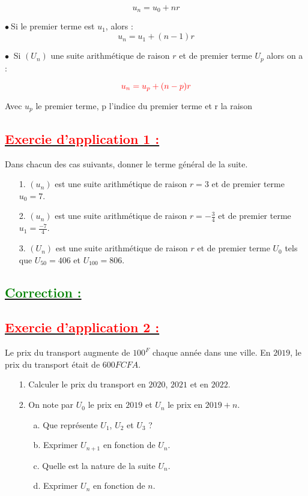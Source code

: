 \documentclass{article}
\begin{document}
$$u_{n}=u_{0}+nr$$
	
$\bullet\ $Si le premier terme est $u_{1}$, alors :
$$u_{n}=u_{1}+(n-1)r$$

$\bullet\ $ Si $(U_n)$ une suite arithmétique de raison $r$ et de premier terme $U_{p}$ alors on a : 
\begin{mdframed}[linecolor=red] %
    \[
    \color{red} u_{n} = u_{p} + (n-p)r
    \]
\end{mdframed}
Avec $u_{p}$ le premier terme, p l'indice du premier terme et r la raison
\subsection*{\underline{\textbf{\textcolor{red}{Exercie d'application 1 :}}}}
Dans chacun des cas suivants, donner le terme général de la suite.
\begin{itemize}
\item[1.]$(u_n)$ est une suite arithmétique de raison $r = 3$ et de premier terme $u_{0}= 7$.
\item[2.]$(u_n)$ est une suite arithmétique de raison $r=-\frac{3}{4}$ et de premier terme 
$u_{1}=\frac{-7}{4}$.
\item[3.] $(U_n)$ est une suite arithmétique de raison $r$ et de premier terme $U_{0}$ tels que $U_{50} = 406$ et $U_{100} = 806$.
\end{itemize}
\subsection*{\underline{\textbf{\textcolor{green}{Correction :}}}}
\subsection*{\underline{\textbf{\textcolor{red}{Exercie d'application 2 :}}}}
Le prix du transport augmente de $100^{F}$ chaque année dans une ville. En $2019$, le prix du transport était de $600FCFA$.
\begin{itemize}
\item[1.]Calculer le prix du transport en $2020$, $2021$ et en $2022.$
\item[2.]On note par $U_{0}$ le prix en $2019$ et $U_{n}$ le prix en $2019 + n.$
\begin{itemize}
	\item[a.]Que représente $U_{1}$, $U_{2}$ et $U_{3}$ ?
	\item[b.]Exprimer $U_{n+1}$ en fonction de $U_{n}.$
	\item[c.]Quelle est la nature de la suite $U_{n}.$
	\item[d.]Exprimer $U_{n}$ en fonction de $n$.
\end{itemize}
\end{itemize}
\end{document}
